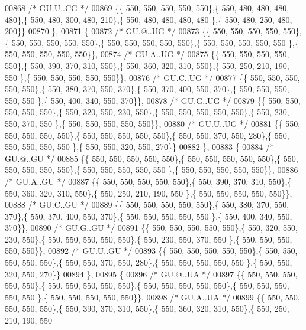 \begin{DoxyCode}
00868 \textcolor{comment}{/* GU.U..CG */}
00869 \{\{ 550, 550, 550, 550, 550\},\{ 550, 480, 480, 480, 480\},\{ 550, 480, 300, 480, 210\},\{ 550, 480, 480, 480, 480
      \},\{ 550, 480, 250, 480, 200\}\}
00870 \},
00871 \{
00872 \textcolor{comment}{/* GU.@..UG */}
00873 \{\{ 550, 550, 550, 550, 550\},\{ 550, 550, 550, 550, 550\},\{ 550, 550, 550, 550, 550\},\{ 550, 550, 550, 550, 550
      \},\{ 550, 550, 550, 550, 550\}\},
00874 \textcolor{comment}{/* GU.A..UG */}
00875 \{\{ 550, 550, 550, 550, 550\},\{ 550, 390, 370, 310, 550\},\{ 550, 360, 320, 310, 550\},\{ 550, 250, 210, 190, 550
      \},\{ 550, 550, 550, 550, 550\}\},
00876 \textcolor{comment}{/* GU.C..UG */}
00877 \{\{ 550, 550, 550, 550, 550\},\{ 550, 380, 370, 550, 370\},\{ 550, 370, 400, 550, 370\},\{ 550, 550, 550, 550, 550
      \},\{ 550, 400, 340, 550, 370\}\},
00878 \textcolor{comment}{/* GU.G..UG */}
00879 \{\{ 550, 550, 550, 550, 550\},\{ 550, 320, 550, 230, 550\},\{ 550, 550, 550, 550, 550\},\{ 550, 230, 550, 370, 550
      \},\{ 550, 550, 550, 550, 550\}\},
00880 \textcolor{comment}{/* GU.U..UG */}
00881 \{\{ 550, 550, 550, 550, 550\},\{ 550, 550, 550, 550, 550\},\{ 550, 550, 370, 550, 280\},\{ 550, 550, 550, 550, 550
      \},\{ 550, 550, 320, 550, 270\}\}
00882 \},
00883 \{
00884 \textcolor{comment}{/* GU.@..GU */}
00885 \{\{ 550, 550, 550, 550, 550\},\{ 550, 550, 550, 550, 550\},\{ 550, 550, 550, 550, 550\},\{ 550, 550, 550, 550, 550
      \},\{ 550, 550, 550, 550, 550\}\},
00886 \textcolor{comment}{/* GU.A..GU */}
00887 \{\{ 550, 550, 550, 550, 550\},\{ 550, 390, 370, 310, 550\},\{ 550, 360, 320, 310, 550\},\{ 550, 250, 210, 190, 550
      \},\{ 550, 550, 550, 550, 550\}\},
00888 \textcolor{comment}{/* GU.C..GU */}
00889 \{\{ 550, 550, 550, 550, 550\},\{ 550, 380, 370, 550, 370\},\{ 550, 370, 400, 550, 370\},\{ 550, 550, 550, 550, 550
      \},\{ 550, 400, 340, 550, 370\}\},
00890 \textcolor{comment}{/* GU.G..GU */}
00891 \{\{ 550, 550, 550, 550, 550\},\{ 550, 320, 550, 230, 550\},\{ 550, 550, 550, 550, 550\},\{ 550, 230, 550, 370, 550
      \},\{ 550, 550, 550, 550, 550\}\},
00892 \textcolor{comment}{/* GU.U..GU */}
00893 \{\{ 550, 550, 550, 550, 550\},\{ 550, 550, 550, 550, 550\},\{ 550, 550, 370, 550, 280\},\{ 550, 550, 550, 550, 550
      \},\{ 550, 550, 320, 550, 270\}\}
00894 \},
00895 \{
00896 \textcolor{comment}{/* GU.@..UA */}
00897 \{\{ 550, 550, 550, 550, 550\},\{ 550, 550, 550, 550, 550\},\{ 550, 550, 550, 550, 550\},\{ 550, 550, 550, 550, 550
      \},\{ 550, 550, 550, 550, 550\}\},
00898 \textcolor{comment}{/* GU.A..UA */}
00899 \{\{ 550, 550, 550, 550, 550\},\{ 550, 390, 370, 310, 550\},\{ 550, 360, 320, 310, 550\},\{ 550, 250, 210, 190, 550

\end{DoxyCode}
